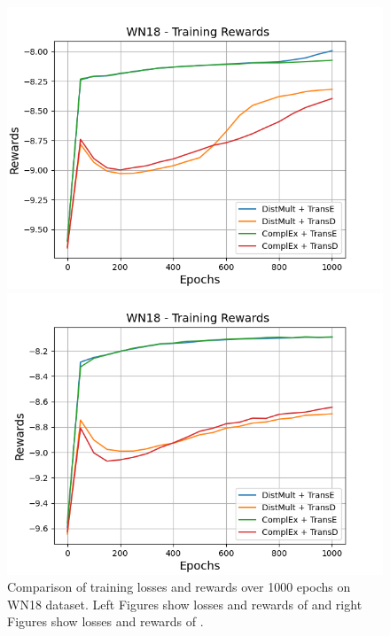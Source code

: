 \begin{figure}
\begin{minipage}{.5\textwidth}
      \includegraphics[width=0.9\linewidth]{figures/results/gan_train/not_pretrained/random/wn18/random_wn18_rew.png}
    \end{minipage}%
    \begin{minipage}{.5\textwidth}
      \centering
      \includegraphics[width=0.9\linewidth]{figures/results/gan_train/not_pretrained/uncertainty/max_distribution/entropy/wn18/uncertainty_wn18_rew.png}
    \end{minipage}%
    \caption{Comparison of training losses and rewards over 1000 epochs on \textsc{WN18} dataset.
    Left Figures show losses and rewards of \origsampling and right Figures show losses and rewards of \ussoftmax.}
    \label{fig:advtrain_wn18_losses_rewards}
\end{figure}